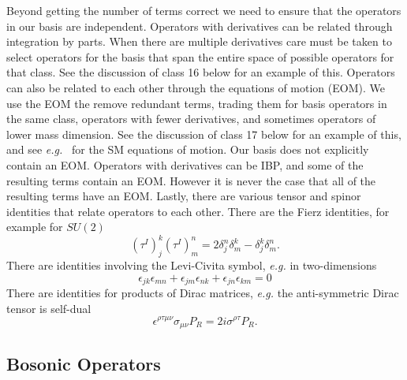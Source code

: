 Beyond getting the number of terms correct we need to ensure that the operators in our basis are independent.
Operators with derivatives can be related through integration by parts.
When there are multiple derivatives care must be taken to select operators for the basis that span the entire space of possible operators for that class.
See the discussion of class 16 below for an example of this.
Operators can also be related to each other through the equations of motion (EOM).
We use the EOM the remove redundant terms, trading them for basis operators in the same class, operators with fewer derivatives, and sometimes operators of lower mass dimension.
See the discussion of class 17 below for an example of this, and see \textit{e.g.}~\cite{Jenkins:2013zja} for the SM equations of motion.
Our basis does not explicitly contain an EOM.
Operators with derivatives can be IBP, and some of the resulting terms contain an EOM.
However it is never the case that all of the resulting terms have an EOM.
Lastly, there are various tensor and spinor identities that relate operators to each other.
There are the Fierz identities, for example for $SU(2)$
\begin{equation}
\label{eq:fierz}
(\tau^I)_j^k (\tau^I)_m^n = 2 \delta_j^n \delta_m^k - \delta_j^k \delta_m^n .
\end{equation}
There are identities involving the Levi-Civita symbol, \textit{e.g.} in two-dimensions
\begin{equation}
\label{eq:lc}
\epsilon_{jk} \epsilon_{mn} + \epsilon_{jm} \epsilon_{nk} + \epsilon_{jn} \epsilon_{km} = 0
\end{equation}
There are identities for products of Dirac matrices, \textit{e.g.} the anti-symmetric Dirac tensor is self-dual
\begin{equation}
\label{eq:dsd}
\epsilon^{\rho\tau\mu\nu} \sigma_{\mu\nu} P_R = 2 i \sigma^{\rho\tau} P_R .
\end{equation}

\subsection{Bosonic Operators}

